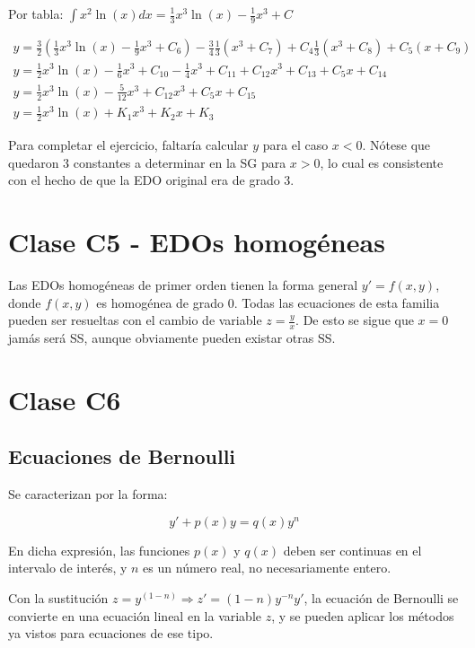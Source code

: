\documentclass{article}
\begin{document}
Por tabla: $\int x^2 \ln(x) dx = \frac{1}{3} x^3 \ln(x) - \frac{1}{9} x^3 + C$

\begin{gather}
y = \frac{3}{2} \left( \frac{1}{3} x^3 \ln(x) - \frac{1}{9} x^3 + C_6 \right) -\frac{3}{4} \frac{1}{3} (x^3 + C_7) + C_4 \frac{1}{3} (x^3 + C_8) + C_5 (x + C_9) \\
y = \frac{1}{2} x^3 \ln(x) - \frac{1}{6} x^3 + C_{10} - \frac{1}{4} x^3 + C_{11} + C_{12} x^3 + C_{13} + C_5 x + C_{14} \\
y = \frac{1}{2} x^3 \ln(x) - \frac{5}{12} x^3 + C_{12} x^3 + C_5 x + C_{15} \\
y = \frac{1}{2} x^3 \ln(x) + K_1 x^3 + K_2 x + K_3
\end{gather}

Para completar el ejercicio, faltaría calcular $y$ para el caso $x<0$. Nótese que quedaron 3 constantes a determinar en la SG para $x >0$, lo cual es consistente con el hecho de que la EDO original era de grado 3.

\section{Clase C5 - EDOs homogéneas}

Las EDOs homogéneas de primer orden tienen la forma general $y' = f(x,y)$, donde $f(x,y)$ es homogénea de grado 0. Todas las ecuaciones de esta familia pueden ser resueltas con el cambio de variable $z = \frac{y}{x}$. De esto se sigue que $x = 0$ jamás será SS, aunque obviamente pueden existar otras SS.

\section{Clase C6}

\subsection{Ecuaciones de Bernoulli}

Se caracterizan por la forma:

\begin{equation}
y' + p(x) y = q(x) y^n
\end{equation}

En dicha expresión, las funciones $p(x)$ y $q(x)$ deben ser continuas en el intervalo de interés, y $n$ es un número real, no necesariamente entero.

Con la sustitución $z = y^(1-n) \Rightarrow z' = (1-n) y^{-n} y'$, la ecuación de Bernoulli se convierte en una ecuación lineal en la variable $z$, y se pueden aplicar los métodos ya vistos para ecuaciones de ese tipo.
\end{document}
